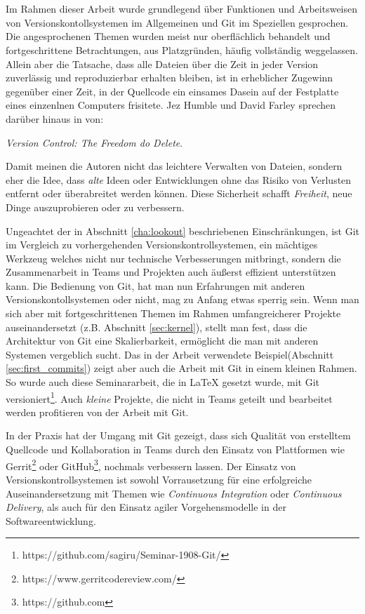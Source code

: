 \chapter{\result}\label{cha:result}
Im Rahmen dieser Arbeit wurde grundlegend über Funktionen und Arbeitsweisen von
Versionskontollsystemen im Allgemeinen und Git im Speziellen gesprochen. Die
angesprochenen Themen wurden meist nur oberflächlich behandelt und
fortgeschrittene Betrachtungen, aus Platzgründen, häufig vollständig
weggelassen. Allein aber die Tatsache, dass alle Dateien über die Zeit in
jeder Version zuverlässig und reproduzierbar erhalten bleiben, ist in
erheblicher Zugewinn gegenüber einer Zeit, in der Quellcode ein einsames Dasein
auf der Festplatte eines einzenlnen Computers frisitete. Jez Humble und David
Farley sprechen darüber hinaus in \cite[S.~35]{cd} von:

\begin{center}
\textit{\glqq{}Version Control: The Freedom do Delete}\grqq{}.
\end{center}

Damit meinen die Autoren nicht das leichtere Verwalten von Dateien, sondern
eher die Idee, dass \textit{alte} Ideen oder Entwicklungen ohne das Risiko von
Verlusten entfernt oder überabreitet werden können. Diese Sicherheit schafft
\textit{Freiheit}, neue Dinge auszuprobieren oder zu verbessern.

Ungeachtet der in Abschnitt \ref{cha:lookout} beschriebenen Einschränkungen, ist
Git im Vergleich zu vorhergehenden Versionskontrollsystemen, ein mächtiges
Werkzeug welches nicht nur technische Verbesserungen mitbringt, sondern die
Zusammenarbeit in Teams und Projekten auch äußerst effizient unterstützen kann.
Die Bedienung von Git, hat man nun Erfahrungen mit anderen
Versionskontollsystemen oder nicht, mag zu Anfang etwas sperrig sein.  Wenn man
sich aber mit fortgeschrittenen Themen im Rahmen umfangreicherer Projekte
auseinandersetzt (z.B. Abschnitt \ref{sec:kernel}), stellt man fest, dass
die Architektur von Git eine Skalierbarkeit, ermöglicht die man mit anderen
Systemen vergeblich sucht. Das in der Arbeit verwendete Beispiel(Abschnitt
\ref{sec:first_commits}) zeigt aber auch die Arbeit mit Git in einem kleinen
Rahmen. So wurde auch diese Seminararbeit, die in LaTeX gesetzt wurde, mit Git
versioniert\footnote{https://github.com/sagiru/Seminar-1908-Git/}. Auch
\textit{kleine} Projekte, die nicht in Teams geteilt und bearbeitet
werden profitieren von der Arbeit mit Git.

In der Praxis hat der Umgang mit Git gezeigt, dass sich Qualität von erstelltem
Quellcode und Kollaboration in Teams durch den Einsatz von Plattformen wie
Gerrit\footnote{https://www.gerritcodereview.com/} oder
GitHub\footnote{https://github.com}, nochmals verbessern lassen. Der Einsatz von
Versionskontrollsystemen ist sowohl Vorrausetzung für eine erfolgreiche
Auseinandersetzung mit Themen wie \textit{Continuous Integration} oder
\textit{Continuous Delivery}, als auch für den Einsatz agiler Vorgehensmodelle
in der Softwareentwicklung.\cite{cd}

